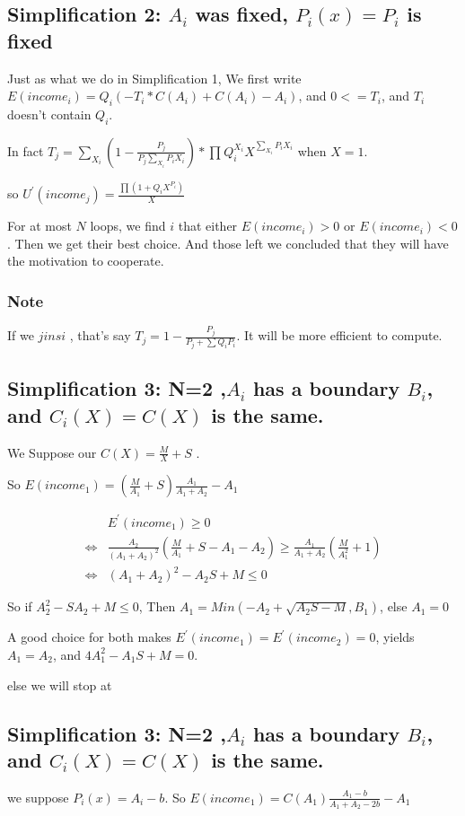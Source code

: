 \documentclass{article}
\begin{document}
\subsection{Simplification 2: $A_i$ was fixed, $P_i(x)=P_i$ is fixed}
\par Just as what we do in Simplification 1, We first write $E(income_i)=Q_i(-T_i*C(A_i)+C(A_i)-A_i)$, and $0<=T_i$, and $T_i$ doesn't contain $Q_i$. 
\par In fact $T_j=\sum_{X_i}(1-\frac{P_j}{P_j\sum_{X_i}P_i X_i})*\prod_{}Q_i^{X_i}X^{\sum_{X_i}P_i X_i}$ when $X=1$.
\par so $U^{'}(income_j)=\frac{\prod (1+Q_iX^{P_i})}{X}$ 
\par For at most $N$ loops, we find $i$ that either $E(income_i)>0$ or $E(income_i)<0$ . Then we get their best choice. And those left we concluded that they will have the motivation to cooperate.
\subsubsection{Note}\par If we $jinsi$ , that's say $T_j=1-\frac{P_j}{P_j+\sum Q_iP_i}$. It will be more efficient to compute.
\subsection{Simplification 3: N=2 ,$A_i$ has a boundary $B_i$, and $C_i(X)=C(X)$ is the same.}
\par We Suppose our $C(X)=\frac{M}{X}+S$ .
\par So $E(income_1)=(\frac{M}{A_1}+S)\frac{A_1}{A_1+A_2}-A_1$
 \par
 \begin{equation}
\begin{aligned}
&E^{'}(income_1)\ge 0
\\\Longleftrightarrow&\frac{A_2}{(A_1+A_2)^2}(\frac{M}{A_1}+S-A_1-A_2)\ge \frac{A_1}{A_1+A_2}(\frac{M}{A_1^2}+1)
\\\Longleftrightarrow&(A_1+A_2)^2-A_2S+M\le 0
\end{aligned}
\end{equation}
\par So if $A_2^2-SA_2+M\le 0$, Then $A_1=Min(-A_2+\sqrt{A_2S-M},B_1)$, else $A_1=0$
\par A good choice for both makes $E^{'}(income_1)=E^{'}(income_2)=0$, yields $A_1=A_2$, and $4A_1^2-A_1S+M=0$.
\par else we will stop at
\subsection{Simplification 3: N=2 ,$A_i$ has a boundary $B_i$, and $C_i(X)=C(X)$ is the same.}
\par we suppose $P_i(x)=A_i-b$.
So $E(income_1)=C(A_1)\frac{A_1-b}{A_1+A_2-2b}-A_1$
\end{document}
